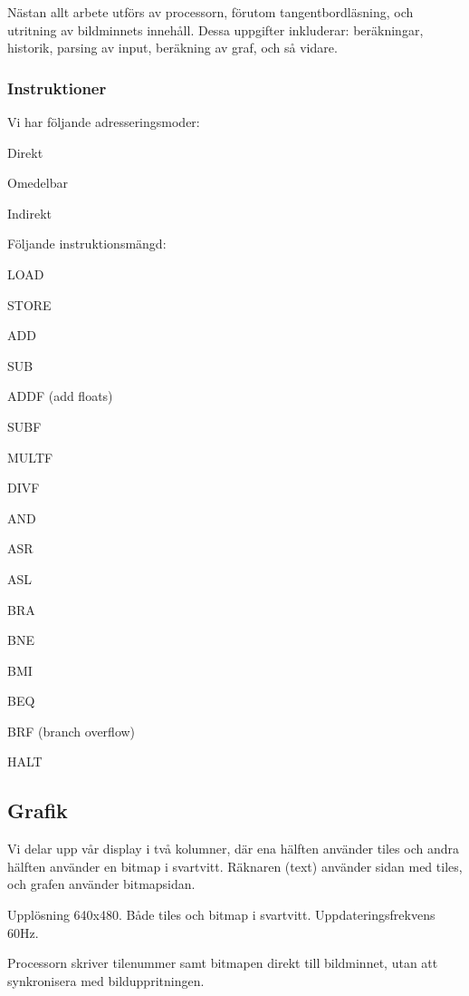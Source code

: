 \documentclass[]{article}
\begin{document}
Nästan allt arbete utförs av processorn, förutom tangentbordläsning, och utritning av bildminnets innehåll. Dessa uppgifter inkluderar: beräkningar, historik, parsing av input, beräkning av graf, och så vidare.

\subsubsection{Instruktioner}
Vi har följande adresseringsmoder:
\begin{itemize*}
\item Direkt
\item Omedelbar
\item Indirekt 
\end{itemize*}
Följande instruktionsmängd:
\begin{itemize*}
\item LOAD
\item STORE
\item ADD
\item SUB
\item ADDF (add floats)
\item SUBF
\item MULTF
\item DIVF
\item AND
\item ASR
\item ASL
\item BRA
\item BNE
\item BMI
\item BEQ
\item BRF (branch overflow)
\item HALT	
\end{itemize*}

\subsection{Grafik} 
Vi delar upp vår display i två kolumner, där ena hälften använder tiles och andra hälften använder en bitmap i svartvitt. Räknaren (text) använder sidan med tiles, och grafen använder bitmapsidan.

Upplösning 640x480. Både tiles och bitmap i svartvitt. Uppdateringsfrekvens 60Hz.

Processorn skriver tilenummer samt bitmapen direkt till bildminnet, utan att synkronisera med bilduppritningen.

\end{document}

